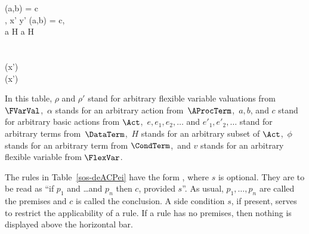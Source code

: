 \documentclass[runningheads]{llncs}
\begin{document}
\begin{table}[!p]
\begin{ruletbl}
{\commf(a,b) = c}
\\
\RuleC
{,\; 
 }
{
  {}{x' \parc y'}}
{\!\commf(a,b) = c,\,
 }
\\
\Rule
{}
{}
\quad
\RuleC
{}
{}
{a \notin H}
\quad
\RuleC
{}
{}
{a \notin H}
\\
\Rule
{}
{}
\\
\RuleC
{}
{}
{\Sat{\gD}{\rho(\fol{\phi})}}
\quad
\RuleC
{}
{}
{\Sat{\gD}{\rho(\fol{\phi})}}
\\
\Rule
{}
{}
\quad
\Rule
{}
{}
\quad
\Rule
{}
{
       {}
       {\eval{\rho}(x')}}
\\
\Rule
{}
{
       {(x')}}
\vspace*{1ex}
\end{ruletbl}
\end{table}
%
In this table, 
$\rho$ and $\rho'$ stand for arbitrary flexible variable valuations from 
$\FVarVal$,\,
$\alpha$ stands for an arbitrary action from~$\AProcTerm$,\,
$a,b$, and $c$ stand for arbitrary basic actions from $\Act$,\,
$e,e_1,e_2,\ldots$ and $e'_1,e'_2,\ldots$ stand for arbitrary terms 
from~$\DataTerm$,\,
$H$ stands for an arbitrary subset of $\Act$,\,
$\phi$ stands for an arbitrary term from $\CondTerm$,\, and
$v$ stands for an arbitrary flexible variable from $\FlexVar$.

The rules in Table~\ref{sos-deACPei} have the form 
, where 
$s$ is optional.
They are to be read as ``if $p_1$ and \ldots and $p_n$ then $c$, 
provided $s$''.
As usual, $p_1,\ldots,p_n$ are called the premises and $c$ is called the 
conclusion.
A side condition $s$, if present, serves to restrict the applicability 
of a rule.
If a rule has no premises, then nothing is displayed above the 
horizontal bar.
\end{document}
